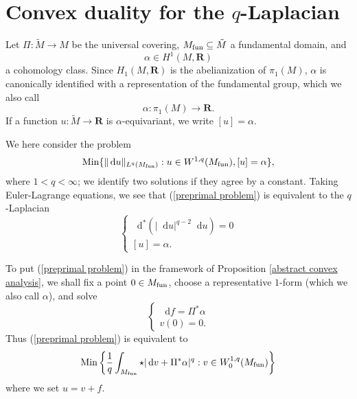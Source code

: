 \documentclass[reqno,11pt]{amsart}
\newcommand{\RR}{\mathbf{R}}
\newcommand*\dif{\mathop{}\!\mathrm{d}}
\newcommand{\Min}{\mathrm{Min}}
\theoremstyle{definition}
\numberwithin{equation}{section}
\begin{document}
\section{Convex duality for the \texorpdfstring{$q$-Laplacian}{q-Laplacian}}
Let $\Pi: \tilde M \to M$ be the universal covering, $M_{\rm fun} \subseteq \tilde M$ a fundamental domain, and
$$\alpha \in H^1(M, \RR)$$
a cohomology class.
Since $H_1(M, \RR)$ is the abelianization of $\pi_1(M)$, $\alpha$ is canonically identified with a representation of the fundamental group, which we also call
$$\alpha: \pi_1(M) \to \RR.$$
If a function $u: \tilde M \to \RR$ is $\alpha$-equivariant, we write $[u] = \alpha$.

We here consider the problem
\begin{equation}\label{preprimal problem}
	\Min\{\|\dif u\|_{L^q(M_{\rm fun})}: u \in W^{1, q}(M_{\rm fun}), [u] = \alpha\},
\end{equation}
where $1 < q < \infty$; we identify two solutions if they agree by a constant.
Taking Euler-Lagrange equations, we see that (\ref{preprimal problem}) is equivalent to the $q$-Laplacian 
\begin{equation}\label{qLaplace}
\begin{cases}
	\dif^*(|\dif u|^{q - 2} \dif u) = 0 \\
	[u] = \alpha.
\end{cases}
\end{equation}

To put (\ref{preprimal problem}) in the framework of Proposition \ref{abstract convex analysis}, we shall fix a point $0 \in M_{\rm fun}$, choose a representative $1$-form (which we also call $\alpha$), and solve 
$$\begin{cases}
\dif f = \Pi^* \alpha \\
v(0) = 0.
\end{cases}$$
Thus (\ref{preprimal problem}) is equivalent to
\begin{equation}\label{primal problem}
	\Min\left\{\frac{1}{q} \int_{M_{\rm fun}} \star|\dif v + \Pi^* \alpha|^q: v \in W^{1, q}_0(M_{\rm fun})\right\}
\end{equation}
where we set $u = v + f$.
\end{document}
